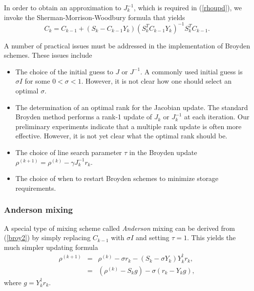 \documentclass[11pt]{book}
\newcommand{\rhok}{\rho^{(k)}}
\begin{document}
\begin{enumerate}
In order to obtain an approximation to $J_k^{-1}$, which is required in
(\ref{rhoupd}), we invoke the Sherman-Morrison-Woodbury formula that yields
\[
C_k = C_{k-1} + (S_k - C_{k-1}Y_k)(S_k^TC_{k-1}Y_k)^{-1}S_k^TC_{k-1}.
\]
\end{enumerate}

A number of practical issues must be addressed in the implementation
of Broyden schemes.  These issues include
\begin{itemize}
\item The choice of the initial guess to $J$ or $J^{-1}$. A commonly
used initial guess is $\sigma I$ for some $0 < \sigma < 1$. However,
it is not clear how one should select an optimal $\sigma$.
\item The determination of an optimal rank for the Jacobian update. 
      The standard Broyden method performs a rank-1 update of 
      $J_k$ or $J_k^{-1}$ at each iteration. Our preliminary experiments 
      indicate that a multiple rank update \cite{fangsaad} is often more
      effective. However, it is not yet clear what the optimal rank
      should be.
\item The choice of line search parameter $\tau$ in the Broyden
update $\rho^{(k+1)} = \rhok - \gamma J_k^{-1} r_k$. 
\item The choice of when to restart Broyden schemes to minimize storage requirements. 
\end{itemize}

\subsubsection{Anderson mixing}
A special type of mixing scheme called {\em Anderson} mixing \cite{anderson} 
can be derived from (\ref{broy2}) by simply replacing $C_{k-1}$ with
$\sigma I$ and setting $\tau=1$. This yields the much simpler updating formula
\begin{eqnarray*}
\rho^{(k+1)} &=& \rhok - \sigma r_k - (S_k - \sigma Y_k)Y_k^{\dagger}r_k, \\
&=& (\rhok - S_k g) - \sigma (r_k - Y_k g),
\end{eqnarray*}
where $g = Y_k^{\dagger}r_k$.
\end{document}
